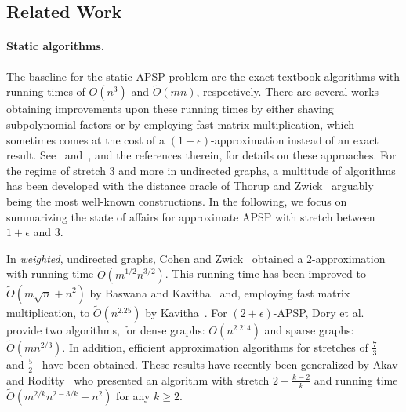 

\subsection{Related Work}

\paragraph{Static algorithms.}
The baseline for the static APSP problem are the exact textbook algorithms with running times of $ O (n^3) $ and $ \tilde O (m n) $, respectively.
There are several works obtaining improvements upon these running times by either shaving subpolynomial factors or by employing fast matrix multiplication, which sometimes comes at the cost of a $ (1 + \epsilon) $-approximation instead of an exact result.
See~\cite{Zwick01} and~\cite{Williams18}, and the references therein, for details on these approaches.
For the regime of stretch $ 3 $ and more in undirected graphs, a multitude of algorithms has been developed with the distance oracle of Thorup and Zwick~\cite{TZ2005} arguably being the most well-known constructions.
In the following, we focus on summarizing the state of affairs for approximate APSP with stretch between $ 1 + \epsilon $ and $ 3 $.

In \emph{weighted}, undirected graphs, Cohen and Zwick~\cite{CohenZ01} obtained a $2$-approximation with running time $ \tilde O (m^{1/2} n^{3/2}) $.
This running time has been improved to $ \tilde O (m \sqrt{n} + n^2) $ by Baswana and Kavitha~\cite{BaswanaK10} and, employing fast matrix multiplication, to $ \tilde O (n^{2.25}) $ by Kavitha~\cite{Kavitha12}.
For $(2+\epsilon)$-APSP, Dory et al.~\cite{DoryFKNVV23} provide two algorithms, for dense graphs: $ O(n^{2.214})$ and sparse graphs: $\tilde O(mn^{2/3})$.
In addition, efficient approximation algorithms for stretches of $ \tfrac{7}{3} $~\cite{CohenZ01} and $ \tfrac{5}{2} $~\cite{Kavitha12} have been obtained.
These results have recently been generalized by Akav and Roditty~\cite{AkavR21} who presented an algorithm with stretch $ 2 + \tfrac{k-2}{k} $ and running time $ \tilde O (m^{2/k} n^{2 - 3/k} + n^2) $ for any $ k \geq 2 $.


